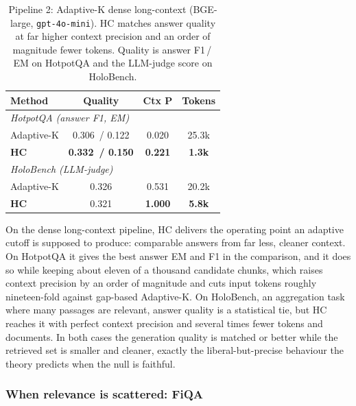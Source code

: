 \documentclass[letterpaper]{article} %
\newcommand{\HotFHC}{0.332}\newcommand{\HotFAdaK}{0.306}
\newcommand{\HotEMHC}{0.150}\newcommand{\HotEMAdaK}{0.122}
\newcommand{\HotPrecHC}{0.221}\newcommand{\HotPrecAdaK}{0.020}
\newcommand{\HolJHC}{0.321}\newcommand{\HolJAdaK}{0.326}
\newcommand{\HolPrecHC}{1.000}\newcommand{\HolPrecAdaK}{0.531}
\begin{document}
\begin{table}[t]
\centering\small
\setlength{\extrarowheight}{1.5pt}
\begin{tabular}{|l|c|c|c|}
\hline
\textbf{Method} & \textbf{Quality} & \textbf{Ctx P} & \textbf{Tokens} \\
\hline
\multicolumn{4}{|l|}{\emph{HotpotQA (answer F1, EM)}}\\
\hline
Adaptive-K & \HotFAdaK\ / \HotEMAdaK & \HotPrecAdaK & 25.3k \\
\hline
\textbf{HC} & \textbf{\HotFHC\ / \HotEMHC} & \textbf{\HotPrecHC} & \textbf{1.3k} \\
\hline
\multicolumn{4}{|l|}{\emph{HoloBench (LLM-judge)}}\\
\hline
Adaptive-K & \HolJAdaK & \HolPrecAdaK & 20.2k \\
\hline
\textbf{HC} & \HolJHC & \textbf{\HolPrecHC} & \textbf{5.8k} \\
\hline
\end{tabular}
\caption{Pipeline 2: Adaptive-K dense long-context (BGE-large,
\texttt{gpt-4o-mini}). HC matches answer quality at far higher context
precision and an order of magnitude fewer tokens. Quality is answer
F1\,/\,EM on HotpotQA and the LLM-judge score on HoloBench.}
\label{tab:p1b}
\end{table}

On the dense long-context pipeline, HC delivers the operating point an
adaptive cutoff is supposed to produce: comparable answers from far less,
cleaner context. On HotpotQA it gives the best answer EM and F1 in the
comparison, and it does so while keeping about eleven of a thousand
candidate chunks, which raises context precision by an order of magnitude
and cuts input tokens roughly nineteen-fold against gap-based Adaptive-K.
On HoloBench, an aggregation task where many passages are relevant,
answer quality is a statistical tie, but HC reaches it with perfect
context precision and several times fewer tokens and documents. In both
cases the generation quality is matched or better while the retrieved set
is smaller and cleaner, exactly the liberal-but-precise behaviour the
theory predicts when the null is faithful.

\subsubsection{When relevance is scattered: FiQA}
\end{document}
